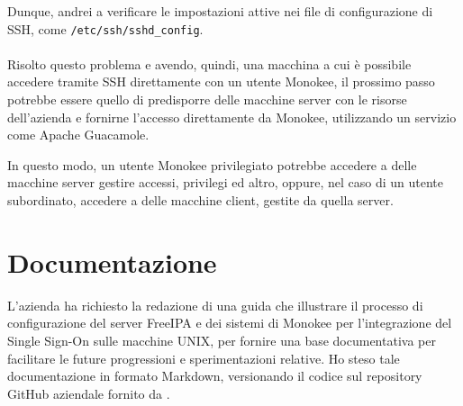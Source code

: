 Dunque, andrei a verificare le impostazioni attive nei file di configurazione di SSH, come \texttt{/etc/ssh/sshd\_config}.
\\ \\
Risolto questo problema e avendo, quindi, una macchina a cui è possibile accedere tramite SSH direttamente con un utente Monokee, il prossimo passo potrebbe essere quello di predisporre delle macchine server con le risorse dell'azienda e fornirne l'accesso 
direttamente da Monokee, utilizzando un servizio come Apache Guacamole.

In questo modo, un utente Monokee privilegiato potrebbe accedere a delle macchine server gestire accessi, privilegi ed altro, oppure, nel caso di un utente subordinato, accedere a delle macchine client, gestite da quella server.
\section{Documentazione}

L'azienda ha richiesto la redazione di una guida che illustrare il processo di configurazione del server FreeIPA e dei sistemi di Monokee per l'integrazione del Single Sign-On sulle macchine UNIX, per fornire una base documentativa per facilitare le future progressioni e sperimentazioni relative. Ho steso tale documentazione in formato Markdown, versionando il codice sul repository GitHub aziendale fornito da \myAzienda.